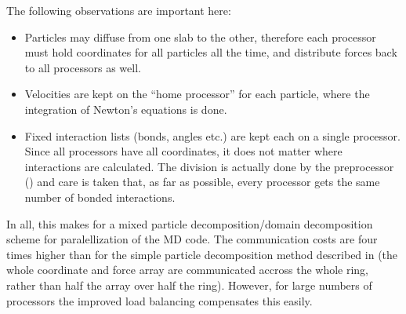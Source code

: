 The following observations are important here:
\begin{itemize}
\item	Particles may diffuse from one slab to the other, therefore each processor
	must hold coordinates for all particles all the time, and distribute forces
	back to all processors as well.
\item	Velocities are kept on the ``home processor'' for each particle,
	where the integration of Newton's equations is done.
\item	Fixed interaction lists (bonds, angles etc.) are kept each
	on a single processor.
	Since all processors have all coordinates, it does not matter where
	interactions are calculated.
	The division is actually done by the {\gromacs} preprocessor 
	() and care is taken that, as far as possible,
	every processor gets the same number of bonded interactions.
\end{itemize}

In all, this makes for a mixed particle decomposition/domain decomposition scheme
for paralellization of the MD code. The communication costs are four times higher
than for the simple particle decomposition method described in 
(the whole coordinate and force array are communicated accross the whole ring,
rather than half the array over half the ring).
However, for large numbers of processors the improved load balancing 
compensates this easily.

